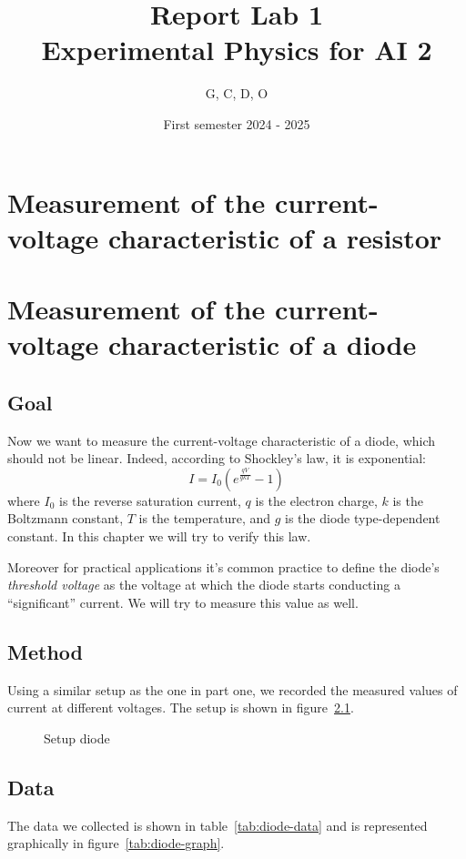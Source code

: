 

\title{Report Lab 1\\\small Experimental Physics for AI 2}
\author{G, C, D, O}
\date{First semester 2024 \-- 2025}



\maketitle

\chapter{Measurement of the current-voltage characteristic of a resistor}
\chapter{Measurement of the current-voltage characteristic of a diode}
\section{Goal}
Now we want to measure the current-voltage characteristic of a diode, which
should not be linear. Indeed, according to Shockley's law, it is exponential:
\[
    I = I_0 \left( e^{\frac{qV}{gkT}} - 1 \right)
\]
where $I_0$ is the reverse saturation current, $q$ is the electron charge, \(k\)
is the Boltzmann constant, \(T\) is the temperature, and \(g\) is the diode
type-dependent constant. In this chapter we will try to verify this law.

Moreover for practical applications it's common practice to define the diode's
\emph{threshold voltage} as the voltage at which the diode starts conducting a
``significant'' current. We will try to measure this value as well.

\section{Method}
Using a similar setup as the one in part one, we recorded the measured values of
current at different voltages. The setup is shown in figure~\ref{fig:setup-diode}.

\begin{figure}[ht]
    \centering
    \caption{Setup diode}\label{fig:setup-diode}
\end{figure}

\section{Data}
The data we collected is shown in table~\ref{tab:diode-data} and is represented
graphically in figure~\ref{tab:diode-graph}.

